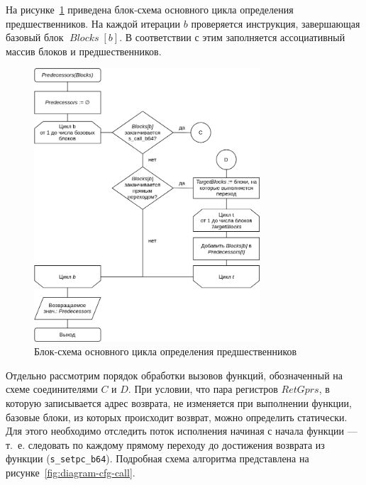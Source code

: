\documentclass[a4paper,14pt]{extarticle}
\newcommand{\var}[1]{\mathop{\mathit{#1}}}
\begin{document}
{На рисунке~\ref{fig:diagram-cfg} приведена блок-схема основного цикла
определения предшественников. На каждой итерации $b$ проверяется инструкция, завершающая
базовый блок $\var{Blocks}[b]$. В соответствии с этим заполняется ассоциативный массив
блоков и предшественников.

\begin{figure}[H]
\centering
\includegraphics[width=0.75\textwidth]{diagrams/alg-cfg}
\caption{Блок-схема основного цикла определения предшественников}
\label{fig:diagram-cfg}
\end{figure}

Отдельно рассмотрим порядок обработки вызовов функций, обозначенный на схеме
соединителями $C$ и $D$. При условии, что пара регистров $RetGprs$, в которую
записывается адрес возврата, не изменяется при выполнении функции,
базовые блоки, из которых происходит возврат, можно определить статически.
Для этого необходимо отследить поток исполнения начиная с начала функции —
т.~е. следовать по каждому прямому переходу до достижения возврата из функции
(\verb|s_setpc_b64|). Подробная схема алгоритма представлена на рисунке~\ref{fig:diagram-cfg-call}.

}
\end{document}
